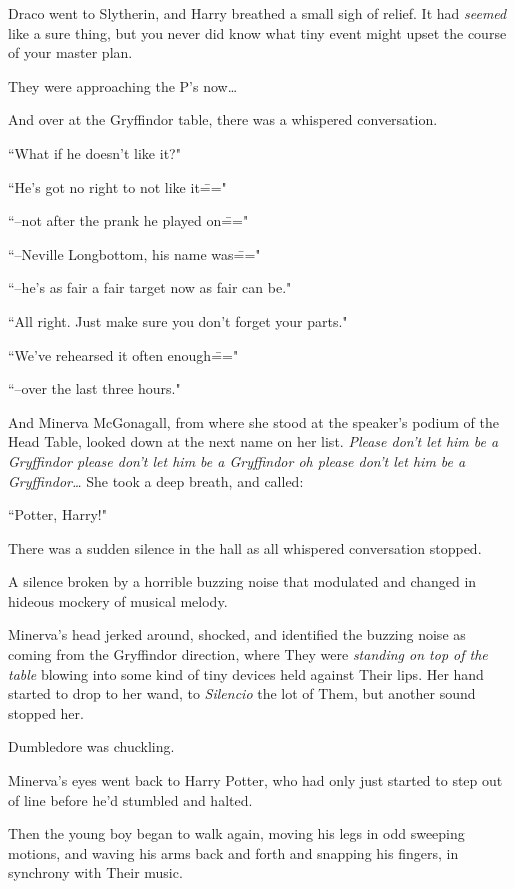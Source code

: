 \later

Draco went to Slytherin, and Harry breathed a small sigh of relief. It had \emph{seemed} like a sure thing, but you never did know what tiny event might upset the course of your master plan.

They were approaching the P's now{\ldots}

And over at the Gryffindor table, there was a whispered conversation.

\begin{em}
``What if he doesn't like it?"

``He's got no right to not like it\==="

``\---not after the prank he played on\==="

``\---Neville Longbottom, his name was\==="

``\---he's as fair a fair target now as fair can be."

``All right. Just make sure you don't forget your parts."

``We've rehearsed it often enough\==="

``\---over the last three hours."
\end{em}

And Minerva McGonagall, from where she stood at the speaker's podium of the Head Table, looked down at the next name on her list. \emph{Please don't let him be a Gryffindor please don't let him be a Gryffindor \emph{oh please} don't let him be a Gryffindor{\ldots}} She took a deep breath, and called:

``Potter, Harry!"

There was a sudden silence in the hall as all whispered conversation stopped.

A silence broken by a horrible buzzing noise that modulated and changed in hideous mockery of musical melody.

Minerva's head jerked around, shocked, and identified the buzzing noise as coming from the Gryffindor direction, where They were \emph{standing on top of the table} blowing into some kind of tiny devices held against Their lips. Her hand started to drop to her wand, to \emph{Silencio} the lot of Them, but another sound stopped her.

Dumbledore was chuckling.

Minerva's eyes went back to Harry Potter, who had only just started to step out of line before he'd stumbled and halted.

Then the young boy began to walk again, moving his legs in odd sweeping motions, and waving his arms back and forth and snapping his fingers, in synchrony with Their music.

